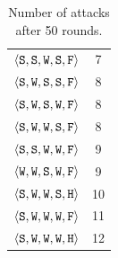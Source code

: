 \begin{table}
{{\begin{minipage}[b]{0.42\hsize}
\begin{tabular}{ l | c }
						$\personality{S}{S}{W}{S}{F}$ & 7\\
						$\personality{S}{W}{S}{S}{F}$ & 8\\
						$\personality{S}{W}{S}{W}{F}$ & 8\\
						$\personality{S}{W}{W}{S}{F}$ & 8\\
						$\personality{S}{S}{W}{W}{F}$ & 9\\
						$\personality{W}{W}{S}{W}{F}$ & 9\\
						$\personality{S}{W}{W}{S}{H}$ & 10\\
						$\personality{S}{W}{W}{W}{F}$ & 11\\
						$\personality{S}{W}{W}{W}{H}$ & 12\\
				\end{tabular}
				\caption{Number of attacks after 50 rounds.}
				\label{tab:numAttacks}
			\end{minipage}
			\hfill
		}}
\end{table}

